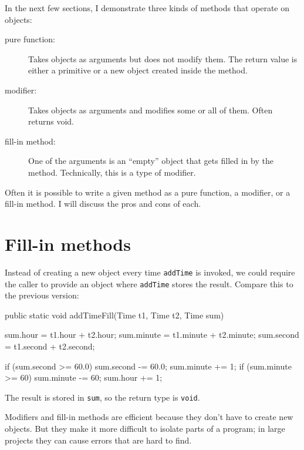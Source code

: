 In the next few
sections, I demonstrate three kinds of methods that
operate on objects:

\begin{description}

\item[pure function:]  Takes objects as
arguments but does not modify them.  The return value is
either a primitive or a new object created inside the method.

\item[modifier:]  Takes objects as arguments and modifies some
or all of them.  Often returns void. 

\item[fill-in method:]  One of the arguments is an ``empty''
object that gets filled in by the method.  Technically, this is
a type of modifier.

\end{description}

Often it is possible to write a given method as a pure function, a modifier,
or a fill-in method.  I will discuss the pros and cons of each.


\section{Fill-in methods}

Instead of creating a new object every time {\tt addTime} is invoked, we could require the caller to provide an object where {\tt addTime} stores the result.
Compare this to the previous version:

\begin{code}
    public static void addTimeFill(Time t1, Time t2, Time sum) {
        sum.hour = t1.hour + t2.hour;
        sum.minute = t1.minute + t2.minute;
        sum.second = t1.second + t2.second;

        if (sum.second >= 60.0) {
            sum.second -= 60.0;
            sum.minute += 1;
        }
        if (sum.minute >= 60) {
            sum.minute -= 60;
            sum.hour += 1;
        }
    }
\end{code}

The result is stored in {\tt sum}, so the return type is {\tt void}.

Modifiers and fill-in methods are efficient because they don't have to create new objects.
But they make it more difficult to isolate parts of a program; in large projects they can cause errors that are hard to find.

